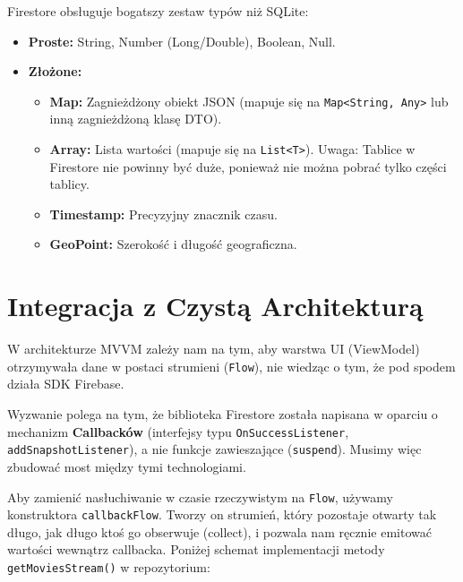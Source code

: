 Firestore obsługuje bogatszy zestaw typów niż SQLite:
\begin{itemize}
    \item \textbf{Proste:} String, Number (Long/Double), Boolean, Null.
    \item \textbf{Złożone:}
    \begin{itemize}
        \item \textbf{Map:} Zagnieżdżony obiekt JSON (mapuje się na \texttt{Map<String, Any>} lub inną zagnieżdżoną klasę DTO).
        \item \textbf{Array:} Lista wartości (mapuje się na \texttt{List<T>}). Uwaga: Tablice w Firestore nie powinny być duże, ponieważ nie można pobrać tylko części tablicy.
        \item \textbf{Timestamp:} Precyzyjny znacznik czasu.
        \item \textbf{GeoPoint:} Szerokość i długość geograficzna.
    \end{itemize}
\end{itemize}

\section{Integracja z Czystą Architekturą}

W architekturze MVVM zależy nam na tym, aby warstwa UI (ViewModel) otrzymywała dane w postaci strumieni (\texttt{Flow}), nie wiedząc o tym, że pod spodem działa SDK Firebase.

Wyzwanie polega na tym, że biblioteka Firestore została napisana w oparciu o mechanizm \textbf{Callbacków} (interfejsy typu \texttt{OnSuccessListener}, \texttt{addSnapshotListener}), a nie funkcje zawieszające (\texttt{suspend}). Musimy więc zbudować most między tymi technologiami.

Aby zamienić nasłuchiwanie w czasie rzeczywistym na \texttt{Flow}, używamy konstruktora \texttt{callbackFlow}. Tworzy on strumień, który pozostaje otwarty tak długo, jak długo ktoś go obserwuje (collect), i pozwala nam ręcznie emitować wartości wewnątrz callbacka. Poniżej schemat implementacji metody \texttt{getMoviesStream()} w repozytorium:

